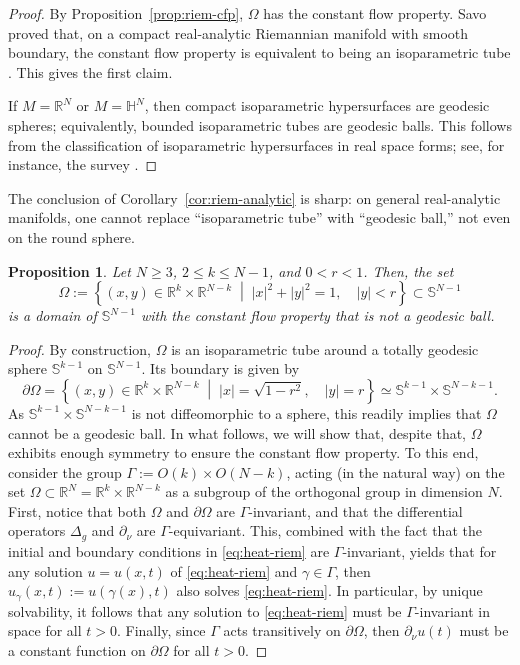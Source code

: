 \documentclass[a4paper,11pt]{article}
\newtheorem{proposition}[theorem]{Proposition}
\newcommand\setbld[2]{\left\{ #1 \;\middle |\; #2\right\}}
\numberwithin{equation}{section}
\begin{document}
\begin{proof}
By Proposition~\ref{prop:riem-cfp}, $\Omega$ has the constant flow property.
Savo proved that, on a compact real-analytic Riemannian manifold with smooth
boundary, the constant flow property is equivalent to being an isoparametric
tube \cite{MR3859464}. This gives the first claim.

If $M=\mathbb R^N$ or $M=\mathbb H^N$, then compact isoparametric hypersurfaces
are geodesic spheres; equivalently, bounded isoparametric tubes are geodesic
balls. This follows from the classification of isoparametric hypersurfaces in
real space forms; see, for instance, the survey \cite[Section~1]{MR2434936}.
\end{proof}

The conclusion of Corollary~\ref{cor:riem-analytic} is sharp: on general
real-analytic manifolds, one cannot replace ``isoparametric tube'' with
``geodesic ball,'' not even on the round sphere.

\begin{proposition}\label{prop:sphere-tubes}
Let $N\ge 3$, $2\le k\le N-1$, and $0<r<1$. Then, the set
\begin{equation*}
    \Omega:=\setbld{(x,y)\in \mathbb{R}^k\times \mathbb{R}^{N-k}}{|x|^2+|y|^2=1,\quad |y|<r}\subset\mathbb{S}^{N-1}
\end{equation*}
is a domain of $\mathbb{S}^{N-1}$ with the constant flow property that is not a geodesic ball.
\end{proposition}
\begin{proof}
By construction, $\Omega$ is an isoparametric tube around a totally geodesic sphere $\mathbb{S}^{k-1}$ on $\mathbb{S}^{N-1}$. Its boundary is given by
\begin{equation*}
    \partial\Omega=\setbld{(x,y)\in \mathbb{R}^k\times \mathbb{R}^{N-k}}{|x|=\sqrt{1-r^2}, \quad |y|=r} \simeq \mathbb{S}^{k-1}\times \mathbb{S}^{N-k-1}.
\end{equation*}
As $\mathbb{S}^{k-1}\times \mathbb{S}^{N-k-1}$ is not diffeomorphic to a sphere, this readily implies that $\Omega$ cannot be a geodesic ball. 
In what follows, we will show that, despite that, $\Omega$ exhibits enough symmetry to ensure the constant flow property. To this end, consider the group $\Gamma:= O(k)\times O(N-k)$,
acting (in the natural way) on the set $\Omega\subset\mathbb{R}^N=\mathbb{R}^k\times\mathbb{R}^{N-k}$ as a subgroup of the orthogonal group in dimension $N$. First, notice that both $\Omega$ and $\partial\Omega$ are $\Gamma$-invariant, and that the differential operators $\Delta_g$ and $\partial_\nu$ are $\Gamma$-equivariant. This,  combined with the fact that the initial and boundary conditions in \eqref{eq:heat-riem} are $\Gamma$-invariant, yields that for any solution $u=u(x,t)$ of \eqref{eq:heat-riem} and $\gamma\in \Gamma$, then $u_\gamma(x,t):=u(\gamma(x), t)$ also solves \eqref{eq:heat-riem}. In particular, by unique solvability, it follows that any solution to \eqref{eq:heat-riem} must be $\Gamma$-invariant in space for all $t>0$. Finally, since $\Gamma$ acts transitively on $\partial\Omega$, then $\partial_\nu u(t)$ must be a constant function on $\partial\Omega$ for all $t>0$.  
\end{proof}
\end{document}
